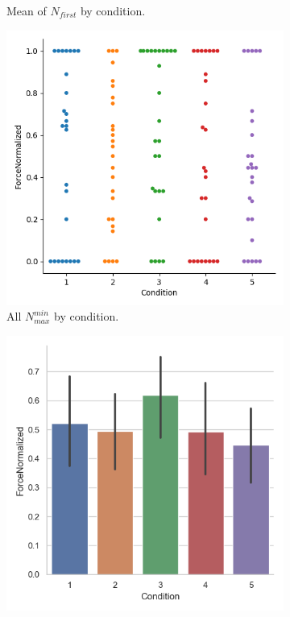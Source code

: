 \begin{figure}[H]
\begin{subfigure}[b]{0.4\textwidth}
         \caption{Mean of $N_{first}$ by condition. }
         \label{fig:meanN1Cond}
     \end{subfigure} 
     \hspace*{\fill}
         \begin{subfigure}[b]{0.4\textwidth}
         \centering
         \includegraphics[width=\textwidth]{Files/Plots/forceNormalized_by_cond_swarm.png}
         \caption{All $N_{max}^{min}$ by condition.}
         \label{fig:allN2Norm}
     \end{subfigure}
\hspace*{\fill}
     \begin{subfigure}[b]{0.4\textwidth}
         \centering
         \includegraphics[width=\textwidth]{Files/Plots/forceNormalized_mean_by_condition.png}

\end{subfigure}
\end{figure}
